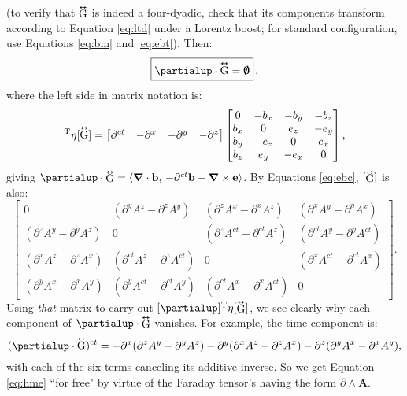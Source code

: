 \documentclass[12pt]{article}
\renewcommand{\vv}[1]{\mathbf{#1}}
\newcommand{\del}{\boldsymbol{\nabla}}
\newcommand{\tightoverset}[2]{%
  \mathop{#2}\limits^{\vbox to -.5ex{\kern-0.75ex\hbox{$#1$}\vss}}}
\newcommand{\inlinedy}[1]{\tightoverset{\text{\tiny$\bm\leftrightarrow$}}{#1}}
\newcommand{\capdy}[1]{ \overset{ \text{\tiny$\bm\leftrightarrow$} }{\vphantom{\text{\small{A}}}\smash{#1}} }
\begin{document}
(to verify that $\inlinedy{\mathrm{G}}$ is indeed a four-dyadic, check that its components transform according to Equation \ref{eq:ltd} under a Lorentz boost; for standard configuration, use Equations \ref{eq:bm} and \ref{eq:ebt}). Then:
\begin{equation}\label{eq:hme}
\boxed{ \vphantom{A_{A_A}} \partialup \cdot \capdy{\mathrm{G}} = \textrm{\mbox{\boldmath $\emptyset$}} } \, ,
\end{equation}
where the left side in matrix notation is:
\begin{equation*}
[\partialup]^{\mathrm{T}} \eta [\capdy{\mathrm{G}}]
=
\begin{bmatrix}
\partial^{ct} & - \partial^x & - \partial^y & - \partial^z
\end{bmatrix}
\begin{bmatrix}
0 & -b_x & -b_y & -b_z \\
b_x & 0 & e_z & -e_y \\
b_y & -e_z & 0 & e_x \\
b_z & e_y & -e_x & 0
\end{bmatrix} ,
\end{equation*}
giving $\partialup \cdot \inlinedy{\mathrm{G}} = \langle \del \cdot \vv b , \, - \partial^{ct} \vv b - \del \times \vv e \rangle$. By Equations \ref{eq:ebc}, $[\inlinedy{\mathrm{G}}]$ is also:
\begin{equation*}
\begin{bmatrix}
0 & ( \partial^y A^z - \partial^z A^y ) & ( \partial^z A^x - \partial^x A^z ) & ( \partial^x A^y - \partial^y A^x ) \\[1.5ex]
( \partial^z A^y - \partial^y A^z ) & 0 & ( \partial^z A^{ct} - \partial^{ct} A^z ) & ( \partial^{ct} A^y - \partial^y A^{ct} ) \\[1.5ex]
( \partial^x A^z - \partial^z A^x ) & ( \partial^{ct} A^z - \partial^z A^{ct} ) & 0 & ( \partial^x A^{ct} - \partial^{ct} A^x ) \\[1.5ex]
( \partial^y A^x - \partial^x A^y ) & ( \partial^y A^{ct} - \partial^{ct} A^y ) & ( \partial^{ct} A^x - \partial^x A^{ct} ) & 0
\end{bmatrix} .
\end{equation*}
Using \emph{that} matrix to carry out $[\partialup]^{\mathrm{T}} \eta [\inlinedy{\mathrm{G}}]$, we see clearly why each component of $\partialup \cdot \inlinedy{\mathrm{G}}$ vanishes. For example, the time component is:
\begin{equation*}
(\partialup \cdot \capdy{\mathrm{G}})^{ct} = - \partial^x ( \partial^z A^y - \partial^y A^z ) - \partial^y ( \partial^x A^z - \partial^z A^x ) - \partial^z ( \partial^y A^x - \partial^x A^y ) ,
\end{equation*}
with each of the six terms canceling its additive inverse. So we get Equation \ref{eq:hme} ``for free" by virtue of the Faraday tensor's having the form $\partialup \wedge \vv A$.
\end{document}

